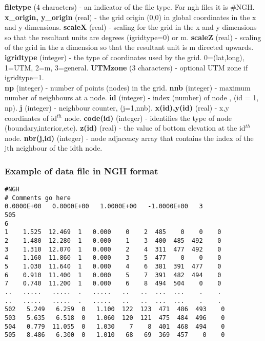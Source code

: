 \documentclass{article}
\begin{document}
\noindent
\textbf{filetype} (4 characters) - an indicator of the file type.  For ngh files it is \#NGH. \newline
\textbf{x\_origin, y\_origin} (real) - the grid origin (0,0) in global coordinates in the x and y dimensions. \newline
\textbf{scaleX} (real) - scaling for the grid in the x and y dimensions so that the resultant units are degrees (igridtype=0) or m. \newline
\textbf{scaleZ} (real) - scaling of the grid in the z dimension so that the resultant unit is m directed upwards.  \newline
\textbf{igridtype} (integer) - the type of coordinates used by the grid. 0=(lat,long), 1=UTM, 2=m, 3=general. \newline
\textbf{UTMzone} (3 characters) - optional UTM zone if igridtype=1. \\
\textbf{np} (integer) - number of points (nodes) in the grid.\newline
\textbf{nnb} (integer) - maximum number of neighbours at a node.\newline
\textbf{id} (integer) - index (number) of node , (id = 1, np). \newline
\textbf{j} (integer)   - neighbour counter, (j=1,nnb). \newline
\textbf{x(id),y(id)} (real) - x,y coordinates of id$^{th}$ node.\newline
\textbf{code(id)} (integer) - identifies the type of node (boundary,interior,etc).\newline
\textbf{z(id)} (real) - the value of bottom elevation at the id$^{th}$ node.\newline
\textbf{nbr(j,id)} (integer) - node adjacency array that contains the index of the jth neighbour of the idth node.\\

\subsubsection[Example of data file in NGH format]{Example of data file in NGH format}
\begin{small}
\begin{lstlisting}
#NGH
# Comments go here
0.0000E+00   0.0000E+00   1.0000E+00   -1.0000E+00   3
505
6
1    1.525  12.469  1   0.000    0    2  485    0    0    0
2    1.480  12.280  1   0.000    1    3  400  485  492    0
3    1.310  12.070  1   0.000    2    4  311  477  492    0
4    1.160  11.860  1   0.000    3    5  477    0    0    0
5    1.030  11.640  1   0.000    4    6  381  391  477    0
6    0.910  11.400  1   0.000    5    7  391  482  494    0
7    0.740  11.200  1   0.000    6    8  494  504    0    0
..   .....   .....  .   .....   ..   ..  ...  ...    .    .
..   .....   .....  .   .....   ..   ..  ...  ...    .    .
502   5.249   6.259  0   1.100  122  123  471  486  493    0
503   5.635   6.518  0   1.060  120  121  475  484  496    0
504   0.779  11.055  0   1.030    7    8  401  468  494    0
505   8.486   6.300  0   1.010   68   69  369  457    0    0
\end{lstlisting}
\end{small}
\end{document}
